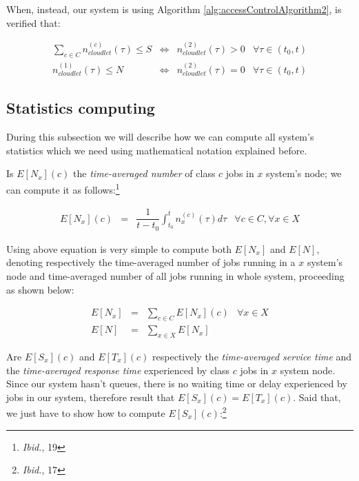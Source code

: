\documentclass[10pt,a4paper]{article}
\begin{document}
When, instead, our system is using Algorithm \ref{alg:accessControlAlgorithm2}, is verified that:

\begin{equation}
\begin{array} {rccr} 
\displaystyle \sum_{c \in C} n_{cloudlet}^{(c)}(\tau) \leq S & \Leftrightarrow & n_{cloudlet}^{(2)}(\tau) > 0 & \forall \tau \in (t_0, t) \\
n_{cloudlet}^{(1)}(\tau) \leq N & \Leftrightarrow & n_{cloudlet}^{(2)}(\tau) = 0 & \forall \tau \in (t_0, t)
\end{array}
\end{equation}

\subsection{Statistics computing}

During this subsection we will describe how we can compute all system's statistics which we need using mathematical notation explained before.

Is $E[N_x](c)$ the \textit{time-averaged number} of class $c$ jobs in $x$ system's node; we can compute it as follows:\footnote{\textit{Ibid.}, 19}

\begin{equation}
\begin{array} {rclr} 
E[N_x](c) & = & \displaystyle  \dfrac{1}{t-t_0}\int_{t_0}^t n_x^{(c)}(\tau)d\tau & \forall c \in C, \forall x \in X
\end{array}
\end{equation}

Using above equation is very simple to compute both $E[N_x]$ and $E[N]$, denoting respectively the time-averaged number of jobs running in a $x$ system's node and time-averaged number of all jobs running in whole system, proceeding as shown below:

\begin{equation}
\begin{array} {rclr} 
E[N_x] & = & \displaystyle  \sum_{c \in C} E[N_x](c) & \forall x \in X \\
E[N] & = & \displaystyle  \sum_{x \in X} E[N_x]
\end{array}
\end{equation}

Are $E[S_x](c)$ and $E[T_x](c)$ respectively the \textit{time-averaged service time} and the \textit{time-averaged response time} experienced by class $c$ jobs in $x$ system node. Since our system hasn't queues, there is no waiting time or delay experienced by jobs in our system, therefore result that $E[S_x](c) = E[T_x](c)$.
Said that, we just have to show how to compute $E[S_x](c)$:\footnote{\textit{Ibid.}, 17}
\end{document}
